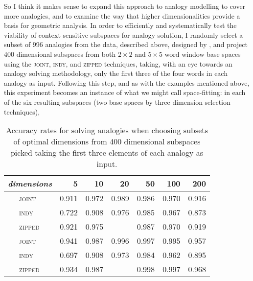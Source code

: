 So I think it makes sense to expand this approach to analogy modelling to cover more analogies, and to examine the way that higher dimensionalities provide a basis for geometric analysis.  In order to efficiently and systematically test the viability of context sensitive subspaces for analogy solution, I randomly select a subset of 996 analogies from the data, described above, designed by \cite{MikolovEA2013b}, and project 400 dimensional subspaces from both $2 \times 2$ and $5 \times 5$ word window base spaces using the \textsc{joint}, \textsc{indy}, and \textsc{zipped} techniques, taking, with an eye towards an analogy solving methodology, only the first three of the four words in each analogy as input.  Following this step, and as with the examples mentioned above, this experiment becomes an instance of what we might call space-fitting: in each of the six resulting subspaces (two base spaces by three dimension selection techniques), 

\begin{table}
\centering
\begin{tabular}{clrrrrrr}
\hline
\multicolumn{2}{l}{\emph{dimensions}} & 5 & 10 & 20 & 50 & 100 & 200 \\
\hline
\parbox[t]{2mm}{} & \textsc{joint} & 0.911 & 0.972 & 0.989 & 0.986 & 0.970 & 0.916 \\
& \textsc{indy} & 0.722 & 0.908 & 0.976 & 0.985 & 0.967 & 0.873 \\
& \textsc{zipped} & 0.921 & 0.975 &  & 0.987 & 0.970 & 0.919 \\
\hline
\parbox[t]{2mm}{} & \textsc{joint} & 0.941 & 0.987 & 0.996 & 0.997 & 0.995 & 0.957 \\
& \textsc{indy} & 0.697 & 0.908 & 0.973 & 0.984 & 0.962 & 0.895 \\
& \textsc{zipped} & 0.934 & 0.987 &  & 0.998 & 0.997 & 0.968 \\
\hline
\end{tabular}
\caption[Finding Spaces for Known Analogies]{Accuracy rates for solving analogies when choosing subsets of optimal dimensions from 400 dimensional subspaces picked taking the first three elements of each analogy as input.}
\label{tab:knowns}
\end{table}

